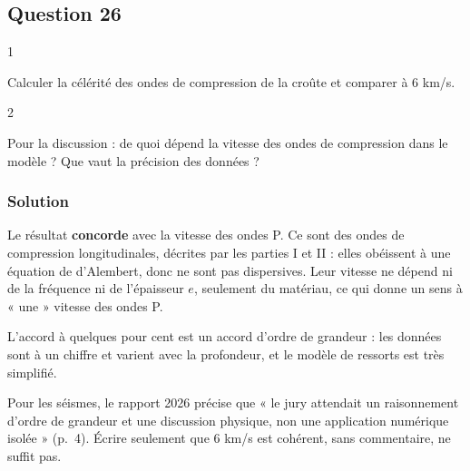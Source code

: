 \documentclass[11pt,a4paper]{article}
\newcommand{\equationajustee}[1]{%
  \sbox{\boiteequation}{$\displaystyle #1$}%
  \ifdim\wd\boiteequation>\linewidth
    \[\resizebox{\linewidth}{!}{\usebox{\boiteequation}}\]%
  \else
    \[#1\]%
  \fi}
\begin{document}
\hypertarget{question-26}{%
\subsection{Question 26}\label{question-26}}

\begin{indication}{1}

Calculer la célérité des ondes de compression de la croûte et comparer à 6 km/s.

\end{indication}

\begin{indication}{2}

Pour la discussion : de quoi dépend la vitesse des ondes de compression dans le modèle ? Que vaut la précision des données ?

\end{indication}

\hypertarget{solution-25}{%
\subsubsection{Solution}\label{solution-25}}

\equationajustee{\begin{aligned}c&=\sqrt{\frac{10^{11}}{2{,}8\times10^3}}\\&=\sqrt{36\times10^{6}}\\&\approx6{,}0\times10^{3}\ \mathrm{m\,s^{-1}}\end{aligned}}

Le résultat \textbf{concorde} avec la vitesse des ondes P. Ce sont des ondes de compression longitudinales, décrites par les parties I et II : elles obéissent à une équation de d'Alembert, donc ne sont pas dispersives. Leur vitesse ne dépend ni de la fréquence ni de l'épaisseur \(e\), seulement du matériau, ce qui donne un sens à « une » vitesse des ondes P.

L'accord à quelques pour cent est un accord d'ordre de grandeur : les données sont à un chiffre et varient avec la profondeur, et le modèle de ressorts est très simplifié.

\begin{jury}

Pour les séismes, le rapport 2026 précise que « le jury attendait un raisonnement d'ordre de grandeur et une discussion physique, non une application numérique isolée » (p.~4). Écrire seulement que 6 km/s est cohérent, sans commentaire, ne suffit pas.

\end{jury}
\end{document}
